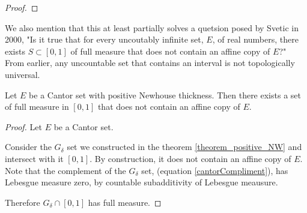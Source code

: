 \begin{proof}

\end{proof}

We also mention that this at least partially solves a quetsion posed by Svetic\cite{Svetic} in 2000, "Is it true that for every uncoutably infinite set, $E$, of real numbers, there exists $S \subset [0,1]$ of full measure that does not contain an affine copy of $E$?"  From earlier, any uncountable set that contains an interval is not topologically universal. 
\begin{theorem}
    Let $E$ be a Cantor set with positive Newhouse thickness.  Then there exists a set of full measure in $[0,1]$ that does not contain an affine copy of $E$. 
\end{theorem}
\begin{proof}
    Let $E$ be a Cantor set.
    
    Consider the $G_{\delta}$ set we constructed in the theorem \ref{theorem_positive_NW} and intersect with it $[0,1]$.  By construction, it does not contain an affine copy of $E$.   Note that the complement of the $G_\delta$ set, (equation \ref{cantorCompliment}), has Lebesgue measure zero, by countable subadditivity of Lebesgue meausure.   
    
    Therefore $G_\delta \cap [0,1]$ has full measure.
\end{proof}




